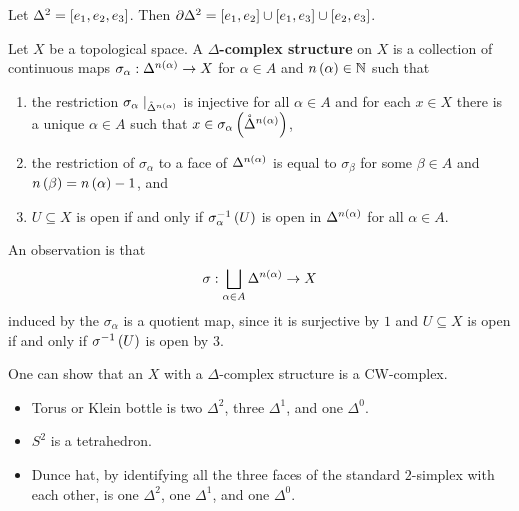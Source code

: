 \begin{example*}
Let $ \Delta^2 = \sb{e_1, e_2, e_3} $. Then $ \partial\Delta^2 = \sb{e_1, e_2} \cup \sb{e_1, e_3} \cup \sb{e_2, e_3} $.
\end{example*}

\begin{definition*}
Let $ X $ be a topological space. A \textbf{$ \Delta $-complex structure} on $ X $ is a collection of continuous maps $ \sigma_\alpha : \Delta^{n\rb{\alpha}} \to X $ for $ \alpha \in A $ and $ n\rb{\alpha} \in \N $ such that
\begin{enumerate}
\item the restriction $ \sigma_\alpha \mid_{\mathring{\Delta}^{n\rb{\alpha}}} $ is injective for all $ \alpha \in A $ and for each $ x \in X $ there is a unique $ \alpha \in A $ such that $ x \in \sigma_\alpha\rb{\mathring{\Delta}^{n\rb{\alpha}}} $,
\item the restriction of $ \sigma_\alpha $ to a face of $ \Delta^{n\rb{\alpha}} $ is equal to $ \sigma_\beta $ for some $ \beta \in A $ and $ n\rb{\beta} = n\rb{\alpha} - 1 $, and
\item $ U \subseteq X $ is open if and only if $ \sigma_\alpha^{-1}\rb{U} $ is open in $ \Delta^{n\rb{\alpha}} $ for all $ \alpha \in A $.
\end{enumerate}
\end{definition*}

An observation is that
$$ \sigma : \bigsqcup_{\alpha \in A} \Delta^{n\rb{\alpha}} \to X $$
induced by the $ \sigma_\alpha $ is a quotient map, since it is surjective by $ 1 $ and $ U \subseteq X $ is open if and only if $ \sigma^{-1}\rb{U} $ is open by $ 3 $.

\begin{remark*}
One can show that an $ X $ with a $ \Delta $-complex structure is a CW-complex.
\end{remark*}

\begin{example*}
\hfill
\begin{itemize}
\item Torus or Klein bottle is two $ \Delta^2 $, three $ \Delta^1 $, and one $ \Delta^0 $.
\item $ S^2 $ is a tetrahedron.
\item Dunce hat, by identifying all the three faces of the standard $ 2 $-simplex with each other, is one $ \Delta^2 $, one $ \Delta^1 $, and one $ \Delta^0 $.
\end{itemize}
\end{example*}

